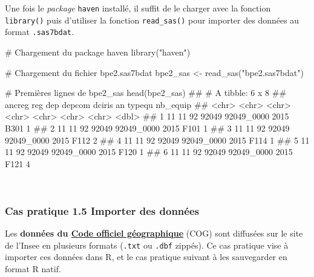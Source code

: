 \documentclass[12pt,twosided, notitlepage]{book}
\newenvironment{Shaded}{}{}
\newcommand{\KeywordTok}[1]{\textcolor[rgb]{0.00,0.00,1.00}{{#1}}}
\newcommand{\StringTok}[1]{\textcolor[rgb]{0.00,0.50,0.50}{{#1}}}
\newcommand{\CommentTok}[1]{\textcolor[rgb]{0.00,0.50,0.00}{{#1}}}
\newcommand{\NormalTok}[1]{{#1}}
\renewenvironment{Shaded}{\begin{snugshade}}{\end{snugshade}}
\begin{document}
Une fois le \emph{package} \texttt{haven} installé, il suffit de le
charger avec la fonction \texttt{library()} puis d'utiliser la fonction
\texttt{read\_sas()} pour importer des
données au format \texttt{.sas7bdat}.

\begin{Shaded}
\begin{Highlighting}[]
\CommentTok{# Chargement du package haven}
\KeywordTok{library}\NormalTok{(}\StringTok{"haven"}\NormalTok{)}

\CommentTok{# Chargement du fichier bpe2.sas7bdat}
\NormalTok{bpe2_sas <-}\StringTok{ }\KeywordTok{read_sas}\NormalTok{(}\StringTok{"bpe2.sas7bdat"}\NormalTok{)}

\CommentTok{# Premières lignes de bpe2_sas}
\KeywordTok{head}\NormalTok{(bpe2_sas)}
  \NormalTok{## # A tibble: 6 x 8}
  \NormalTok{##   ancreg   reg   dep depcom     dciris    an typequ nb_equip}
  \NormalTok{##    <chr> <chr> <chr>  <chr>      <chr> <chr>  <chr>    <dbl>}
  \NormalTok{## 1     11    11    92  92049 92049_0000  2015   B301        1}
  \NormalTok{## 2     11    11    92  92049 92049_0000  2015   F101        1}
  \NormalTok{## 3     11    11    92  92049 92049_0000  2015   F112        2}
  \NormalTok{## 4     11    11    92  92049 92049_0000  2015   F114        1}
  \NormalTok{## 5     11    11    92  92049 92049_0000  2015   F120        1}
  \NormalTok{## 6     11    11    92  92049 92049_0000  2015   F121        4}
\end{Highlighting}
\end{Shaded}

~

\subsubsection{\texorpdfstring{\textbf{Cas pratique 1.5} Importer des
données}{Cas pratique 1.5 Importer des données}}\label{cas-pratique-1.5-importer-des-donnees}

 Les
\textbf{données du
\href{https://www.insee.fr/fr/information/2666684}{Code officiel
géographique}} (COG) sont diffusées sur le site de l'Insee en plusieurs
formats (\texttt{.txt} ou \texttt{.dbf} zippés). Ce cas pratique vise à
importer ces données dans R, et le cas pratique suivant à les
sauvegarder en format R natif.
\end{document}
